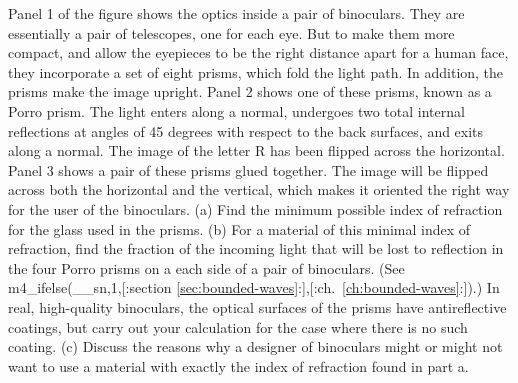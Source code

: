 Panel 1 of the figure shows the optics inside a pair of binoculars.
They are essentially a pair of telescopes, one for each eye. But to make them more compact,
and allow the eyepieces to be the right distance apart for a human face, they incorporate
a set of eight prisms, which fold the light path. In addition, the prisms make the image upright.
Panel 2 shows one of these prisms, known
as a Porro prism. The light enters along a normal, undergoes
two total internal reflections at angles of 45 degrees with respect to the back surfaces,
and exits along a normal. The image of the letter R has been flipped across the horizontal.
Panel 3 shows a pair of these prisms glued together. The image will be flipped across
both the horizontal and the vertical, which makes it oriented the right way for the user
of the binoculars.\hwendpart
(a) Find the minimum possible index of refraction for the glass used in the prisms.\hwendpart
(b) For a material of this minimal index of refraction, find the fraction of the incoming
light that will be lost to reflection in the four Porro prisms on a each side of a pair
of binoculars. (See
m4_ifelse(__sn,1,[:section \ref{sec:bounded-waves}:],[:ch.~\ref{ch:bounded-waves}:]).)
In real, high-quality binoculars, the optical surfaces of the prisms 
have antireflective coatings, but carry out your calculation for the case where there is
no such coating.\hwendpart
(c) Discuss the reasons why a designer of binoculars might or might not want to use a material
with exactly the index of refraction found in part a.
